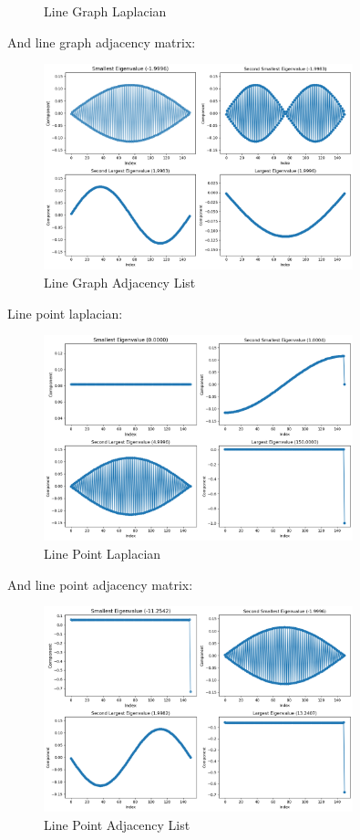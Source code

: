 \documentclass[12pt]{article}
\begin{document}
\begin{enumerate}[leftmargin=\labelsep, label=(\alph*)]
\begin{figure}[H]
            \caption{Line Graph Laplacian}
        \end{figure}
        And line graph adjacency matrix:
        \begin{figure}[H]
            \centering
            \includegraphics[width=0.8\textwidth]{line_A.png}
            \caption{Line Graph Adjacency List}
        \end{figure}
        Line point laplacian:
        \begin{figure}[H]
            \centering
            \includegraphics[width=0.8\textwidth]{line_point_L.png}
            \caption{Line Point Laplacian}
        \end{figure}
        And line point adjacency matrix:
        \begin{figure}[H]
            \centering
            \includegraphics[width=0.8\textwidth]{line_point_A.png}
            \caption{Line Point Adjacency List}
        \end{figure}


\end{enumerate}
\end{document}
